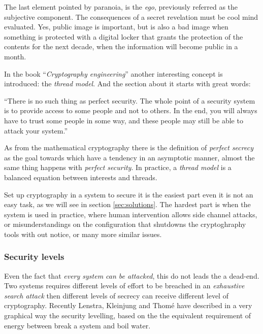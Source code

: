 \documentclass[10pt,a4paper,twoside]{llncs}
\begin{document}
The last element pointed by paranoia, is the \emph{ego}, previously referred as the subjective component. The consequences of a secret revelation must be cool mind evaluated. Yes, public image is important, but is also a bad image when something is protected with a digital locker that grants the protection of the contents for the next decade, when the information will become public in a month.

In the book ``\emph{Cryptography engineering}'' \cite{cryptoEngineering} another interesting concept is introduced: the \emph{thread model}. And the section about it starts with great words:

\begin{definition}\label{def:perfectSecurity}
    ``There is no such thing as perfect security. The whole point of a security system is to provide access to some people and not to others. In the end, you will always have to trust some people in some way, and these people may still be able to attack your system.'' 
\end{definition}

As from the mathematical cryptography there is the definition of \emph{perfect secrecy} as the goal towards which have a tendency in an asymptotic manner, almost the same thing happens with \emph{perfect security}. In practice, a \emph{thread model} is a balanced equation between interests and threads.

Set up cryptography in a system to secure it is the easiest part even it is not an easy task, as we will see in section \ref{sec:solutions}. The hardest part is when the system is used in practice, where human intervention allows side channel attacks, or misunderstandings on the configuration that shutdowns the cryptoghraphy tools with out notice, or many more similar issues.

\subsubsection{Security levels}\label{sec:securityLevels}

Even the fact that \emph{every system can be attacked}, this do not leads the a dead-end. Two systems requires different levels of effort to be breached in an \emph{exhaustive search attack} then different levels of secrecy can receive different level of cryptography. Recently Lenstra, Kleinjung and Thom\'e \cite{lenstrauniversal13} have described in a very graphical way the security levelling, based on the the equivalent requirement of energy between break a system and boil water.
\end{document}
